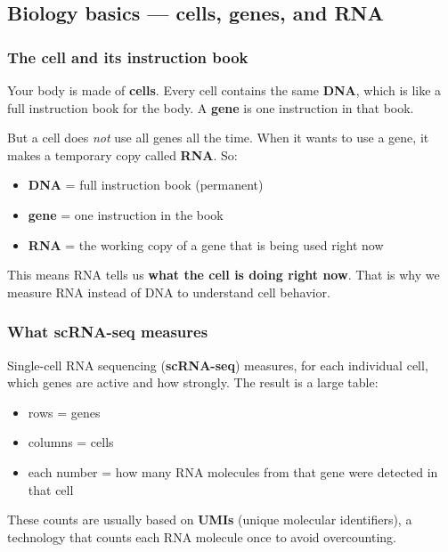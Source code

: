 \documentclass[11pt, a4paper]{article}
\begin{document}
\subsection{Biology basics — cells, genes, and RNA}

\subsubsection{The cell and its instruction book}

Your body is made of \textbf{cells}. Every cell contains the same \textbf{DNA},
which is like a full instruction book for the body. A \textbf{gene} is one instruction
in that book.

But a cell does \textit{not} use all genes all the time. When it wants to use a gene,
it makes a temporary copy called \textbf{RNA}. So:

\begin{itemize}[nosep]
  \item \textbf{DNA} = full instruction book (permanent)
  \item \textbf{gene} = one instruction in the book
  \item \textbf{RNA} = the working copy of a gene that is being used right now
\end{itemize}

This means RNA tells us \textbf{what the cell is doing right now}.
That is why we measure RNA instead of DNA to understand cell behavior.

\subsubsection{What scRNA-seq measures}

Single-cell RNA sequencing (\textbf{scRNA-seq}) measures, for each individual cell,
which genes are active and how strongly. The result is a large table:

\begin{itemize}[nosep]
  \item rows = genes
  \item columns = cells
  \item each number = how many RNA molecules from that gene were detected in that cell
\end{itemize}

These counts are usually based on \textbf{UMIs} (unique molecular identifiers),
a technology that counts each RNA molecule once to avoid overcounting.
\end{document}

